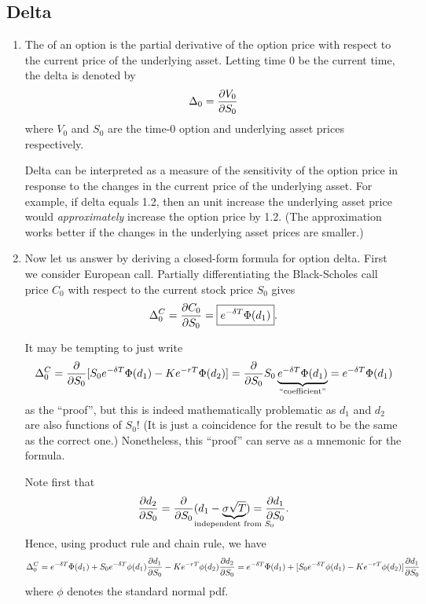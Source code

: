 \subsection{Delta}
\label{subsect:delta}
\begin{enumerate}
\item The  of an option is the partial derivative of the option
price with respect to the current price  of the underlying
asset. Letting time 0 be the current time, the delta is denoted by
\[
\Delta_0=\pdv{V_0}{S_0}
\]
where \(V_0\) and \(S_0\) are the time-0 option and underlying asset prices
respectively.

Delta can be interpreted as a measure of the sensitivity of the option price in
response to the changes in the current price of the underlying asset. For
example, if delta equals 1.2, then an unit increase the underlying asset price
would \emph{approximately} increase the option price by 1.2. (The approximation
works better if the changes in the underlying asset prices are smaller.)

\item \label{it:call-delta-fmla} Now let us answer  by
deriving a closed-form formula for option delta. First we consider European
call. Partially differentiating the Black-Scholes call price \(C_0\) with
respect to the current stock price \(S_0\) gives
\[
\Delta_0^{C}=\pdv{C_0}{S_0}=\boxed{e^{-\delta T}\Phi(d_1)}.
\]
\begin{pf}
\begin{warning}
It may be tempting to just write
\[
\Delta_0^{C}=\pdv{}{S_0}[S_0e^{-\delta T}\Phi(d_1)-Ke^{-rT}\Phi(d_2)]
=\pdv{}{S_0}S_0\underbrace{e^{-\delta T}\Phi(d_1)}_{\text{``coefficient''}}
=e^{-\delta T}\Phi(d_1)
\]
as the ``proof'', but this is indeed mathematically problematic as \(d_1\) and
\(d_2\) are also functions of \(S_0\)! (It is just a coincidence for the result
to be the same as the correct one.) Nonetheless, this ``proof'' can serve as a
mnemonic for the formula.
\end{warning}

Note first that
\[
\pdv{d_2}{S_0}={\pdv{}{S_0}}(d_1-\underbrace{\sigma\sqrt{T}}_{\mathclap{\text{independent from \(S_0\)}}})
=\pdv{d_1}{S_0}.
\]
Hence, using product rule and chain rule, we have
\[
\Delta_0^C=e^{-\delta T}\Phi(d_1)+S_0e^{-\delta T}\phi(d_1)\pdv{d_1}{S_0}-Ke^{-rT}\phi(d_2)\pdv{d_2}{S_0}
=e^{-\delta T}\Phi(d_1)+[S_0e^{-\delta T}\phi(d_1)-Ke^{-rT}\phi(d_2)]\pdv{d_1}{S_0}
\]
where \(\phi\) denotes the standard normal pdf.


\end{pf}
\end{enumerate}
